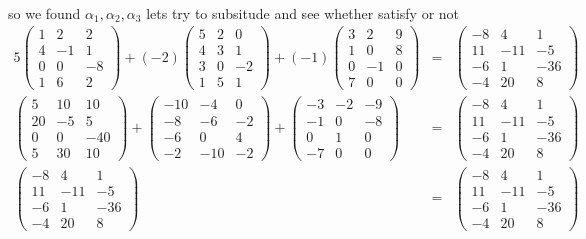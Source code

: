 \documentclass[11pt]{article}
\begin{document}
\paragraph{}so we found $\alpha_1 , \alpha_2 , \alpha_3$ lets try to subsitude and see whether satisfy or not
\begin{eqnarray*}
5
\begin{pmatrix}
1& 2 & 2\\
4& -1 & 1\\
0& 0 & -8\\
1& 6 & 2
\end{pmatrix} 
+
(-2)
\begin{pmatrix}
5& 2 & 0\\
4& 3 & 1\\
3& 0 & -2\\
1& 5 & 1
\end{pmatrix} 
+
(-1)
\begin{pmatrix}
3& 2 & 9\\
1& 0& 8\\
0& -1 & 0\\
7& 0 & 0
\end{pmatrix}
&=&
\begin{pmatrix}
-8& 4& 1\\
11& -11 & -5\\
-6& 1 & -36\\
-4& 20& 8
\end{pmatrix}\\
\begin{pmatrix}
5& 10 & 10\\
20& -5 & 5\\
0& 0 & -40\\
5& 30 & 10
\end{pmatrix} 
+
\begin{pmatrix}
-10& -4 & 0\\
-8& -6 & -2\\
-6& 0 & 4\\
-2& -10& -2
\end{pmatrix} 
+
\begin{pmatrix}
-3& -2 & -9\\
-1& 0& -8\\
0& 1 & 0\\
-7& 0 & 0
\end{pmatrix}
&=&
\begin{pmatrix}
-8& 4& 1\\
11& -11 & -5\\
-6& 1 & -36\\
-4& 20& 8
\end{pmatrix}\\
\begin{pmatrix}
-8& 4& 1\\
11& -11 & -5\\
-6& 1 & -36\\
-4& 20& 8
\end{pmatrix}
&=&
\begin{pmatrix}
-8& 4& 1\\
11& -11 & -5\\
-6& 1 & -36\\
-4& 20& 8
\end{pmatrix}
\end{eqnarray*}
\end{document}
